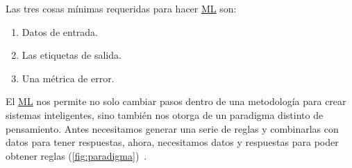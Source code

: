 Las tres cosas mínimas requeridas para hacer \hyperlink{abbr}{ML} son:

\begin{enumerate}
    \item{Datos de entrada.}
    \item{Las etiquetas de salida.}
    \item{Una métrica de error.} 
\end{enumerate}

El \hyperlink{abbr}{ML} nos permite no solo cambiar pasos dentro de una
metodología para crear sistemas inteligentes, sino también nos otorga de un
paradigma distinto de pensamiento. Antes necesitamos generar una serie de reglas
y combinarlas con datos para tener respuestas, ahora, necesitamos datos y
respuestas para poder obtener reglas (\autoref{fig:paradigma})~\cite{Chollet2018}.


